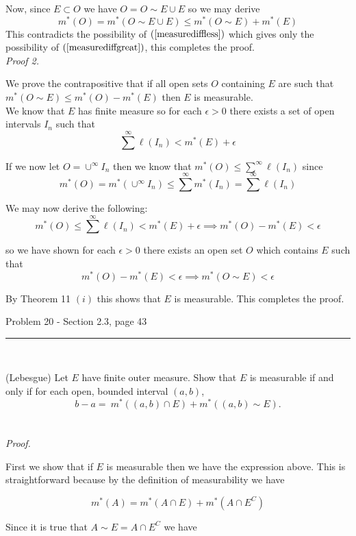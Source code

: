 \documentclass[11pt,reqno]{article}
\begin{document}
Now, since $E \subset O$ we have $O = O \sim E \cup E$ so we may derive 
\[ m^*(O) =  m^*(O \sim E \cup E) \le m^*(O \sim E) + m^*(E)  \]
This contradicts the possibility of $(\ref{measurediffless})$ which gives only the possibility of $(\ref{measurediffgreat})$, this completes the proof.\\

\emph{Proof 2.}

We prove the contrapositive that if all open sets $O$ containing $E$ are such that\\ $m^*(O \sim E) \le m^*(O) - m^*(E)$ then $E$ is measurable.\\
We know that $E$ has finite measure so for each $\epsilon > 0$ there exists a set of open intervals $I_n$ such that 
\[ \sum^\infty \ell(I_n) < m^*(E) + \epsilon\]

\noindent If we now let $O = \cup^\infty I_n$ then we know that $m^*(O) \le \sum^\infty \ell(I_n)$ since 
\[ m^*(O) = m^*(  \cup^\infty I_n ) \le \sum^\infty m^*(I_n) = \sum^\infty \ell(I_n)  \]

\noindent We may now derive the following:
\[ m^*(O) \le \sum^\infty \ell(I_n) < m^*(E) + \epsilon \implies m^*(O) - m^*(E) < \epsilon \]

\noindent so we have shown for each $\epsilon > 0$ there exists an open set $O$ which contains $E$ such that 
\[ m^*(O) - m^*(E) < \epsilon \implies m^*(O \sim E) < \epsilon\]

\noindent By Theorem 11 $(i)$ this shows that $E$ is measurable. This completes the proof.

\begin{flushleft} 
Problem 20 - Section 2.3, page 43\\
\rule{500pt}{1pt}\\
\end{flushleft} 

(Lebesgue) Let $E$ have finite outer measure. Show that $E$ is measurable if and only if for each open, bounded interval $(a,b)$,
\[ b - a =  \ m^*((a,b) \cap E) + m^*((a,b) \sim E). \]
\\\\ \emph{Proof.}

First we show that if $E$ is measurable then we have the expression above. This is straightforward because  by the definition of measurability we have

\[  m^*(A) = m^*(A \cap E) + m^*(A \cap E^C) \]

\noindent Since it is true that $A \sim E = A \cap E^C$ we have
\end{document}
